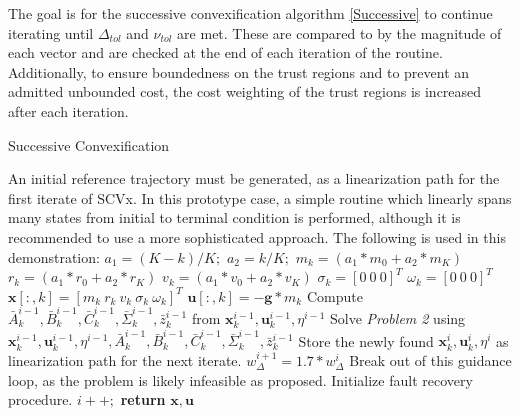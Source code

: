 \documentclass[conf]{new-aiaa}
\begin{document}
The goal is for the successive convexification algorithm \ref{Successive} to continue iterating until $\Delta_{tol}$ and $\nu_{tol}$ are met. These are compared to by the magnitude of each vector and are checked at the end of each iteration of the routine. Additionally, to ensure boundedness on the trust regions and to prevent an admitted unbounded cost, the cost weighting of the trust regions is increased after each iteration.

\begin{algorithm}
\caption{Successive Convexification}\label{Successive}
\begin{algorithmic}[1]
\State An initial reference trajectory must be generated, as a linearization path for the first iterate of SCVx. In this prototype case, a simple routine which linearly spans many states from initial to terminal condition is performed, although it is recommended to use a more sophisticated approach. The following is used in this demonstration:
\State		$a_1 = (K-k)/K;$
\State		$	a_2 = k/K;$
\State		$	m_k = (a_1*m_0 + a_2*m_K)$
\State		$	r_k = (a_1*r_0 + a_2*r_K)$
\State		$	v_k = (a_1*v_0 + a_2*v_K)$
\State		$	\sigma_k = [0 \ 0 \ 0]^T$
\State		$	\omega_k = [0 \ 0 \ 0]^T$
\State		$	\mathbf{x}[:, k] = [m_k \ r_k \ v_k \ \sigma_k  \ \omega_k]^T$
\State		$	\mathbf{u}[:, k] = -\mathbf{g} * m_k$
\EndFor{}
\State Compute $\bar{A}_k^{i-1}, \bar{B}_k^{i-1}, \bar{C}_k^{i-1}, \bar{\Sigma}_k^{i-1}, \bar{z}_k^{i-1}$ from $\mathbf{x}_k^{i-1}, \mathbf{u}_k^{i-1}, \eta^{i-1}$
\State Solve \textit{Problem 2} using $\mathbf{x}_k^{i-1}, \mathbf{u}_k^{i-1}, \eta^{i-1}, \bar{A}_k^{i-1}, \bar{B}_k^{i-1}, \bar{C}_k^{i-1}, \bar{\Sigma}_k^{i-1}, \bar{z}_k^{i-1}$
\State Store the newly found $\mathbf{x}_k^{i}, \mathbf{u}_k^{i}, \eta^{i}$ as linearization path for the next iterate.
\State $w^{i+1}_\Delta = 1.7*w^{i}_\Delta$
\State Break out of this guidance loop, as the problem is likely infeasible as proposed.
\State Initialize fault recovery procedure.
\EndIf
\State $i++;$
\EndWhile 
\State \textbf{return} $\mathbf{x}, \mathbf{u}$
\EndProcedure
\end{algorithmic}
\end{algorithm}
\end{document}
